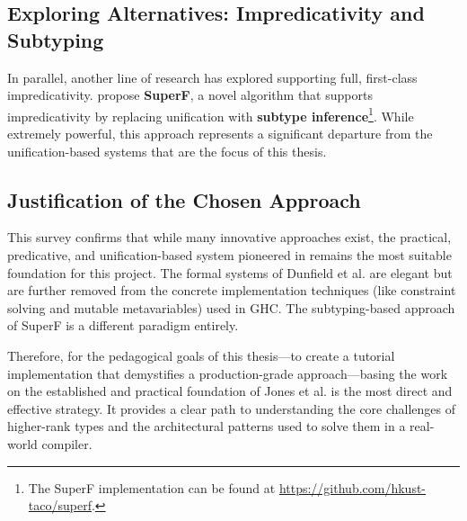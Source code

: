 \subsection{Exploring Alternatives: Impredicativity and Subtyping}

In parallel, another line of research has explored supporting full, first-class impredicativity. \citeauthor{parreaux-when-2024} \cite{parreaux-when-2024} propose \textbf{SuperF}, a novel algorithm that supports impredicativity by replacing unification with \textbf{subtype inference}\footnote{The SuperF implementation can be found at \url{https://github.com/hkust-taco/superf}.}. While extremely powerful, this approach represents a significant departure from the unification-based systems that are the focus of this thesis.

\subsection{Justification of the Chosen Approach}

This survey confirms that while many innovative approaches exist, the practical, predicative, and unification-based system pioneered in \cite{jones-practical-2007} remains the most suitable foundation for this project. The formal systems of Dunfield et al. are elegant but are further removed from the concrete implementation techniques (like constraint solving and mutable metavariables) used in GHC. The subtyping-based approach of SuperF is a different paradigm entirely.

Therefore, for the pedagogical goals of this thesis---to create a tutorial implementation that demystifies a production-grade approach---basing the work on the established and practical foundation of Jones et al. is the most direct and effective strategy. It provides a clear path to understanding the core challenges of higher-rank types and the architectural patterns used to solve them in a real-world compiler.